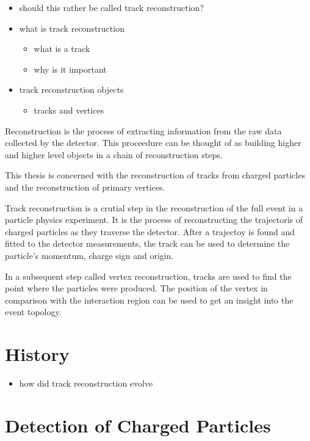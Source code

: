\begin{itemize}
    \color{red}
    \item should this rather be called track reconstruction?
    \item what is track reconstruction
    \begin{itemize}
        \item what is a track
        \item why is it important
    \end{itemize}
    \item track reconstruction objects
    \begin{itemize}
        \item tracks and vertices
    \end{itemize}
\end{itemize}

Reconstruction is the process of extracting information from the raw data collected by the detector. This proceedure can be thought of as building higher and higher level objects in a chain of reconstruction steps.

This thesis is concerned with the reconstruction of tracks from charged particles and the reconstruction of primary vertices.

Track reconstruction is a crutial step in the reconstruction of the full event in a particle physics experiment. It is the process of reconstructing the trajectoris of charged particles as they traverse the detector. After a trajectoy is found and fitted to the detector measurements, the track can be used to determine the particle's momentum, charge sign and origin.

In a subsequent step called vertex reconstruction, tracks are used to find the point where the particles were produced. The position of the vertex in comparison with the interaction region can be used to get an insight into the event topology.

\section{History}

\begin{itemize}
    \color{red}
    \item how did track reconstruction evolve
\end{itemize}

\section{Detection of Charged Particles}

